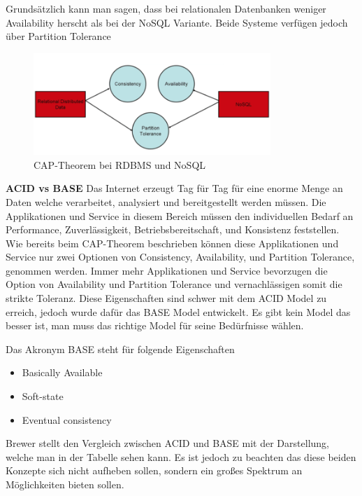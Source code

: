 Grundsätzlich kann man sagen, dass bei relationalen Datenbanken weniger Availability herscht als bei der NoSQL Variante. Beide Systeme verfügen jedoch über Partition Tolerance\cite{MELD.CH2-noSQL.capTheoremComp}

\begin{figure}[!htb]\centering
	\includegraphics[width=0.8\textwidth]{images/capTheorem}
	\caption{CAP-Theorem bei RDBMS und NoSQL\cite{MELD.CH2-noSQL.capTheoremComp}}
\end{figure}

\tab\textbf{ACID vs BASE\newline}
Das Internet erzeugt Tag für Tag für eine enorme Menge an Daten welche verarbeitet, analysiert und bereitgestellt werden müssen. Die Applikationen und Service in diesem Bereich müssen den individuellen Bedarf an Performance, Zuverlässigkeit, Betriebsbereitschaft, und Konsistenz feststellen. Wie bereits beim CAP-Theorem beschrieben können diese Applikationen und Service nur zwei Optionen von Consistency, Availability, und Partition Tolerance, genommen werden. Immer mehr Applikationen und Service bevorzugen die Option von Availability und Partition Tolerance und vernachlässigen somit die strikte Toleranz. Diese Eigenschaften sind schwer mit dem ACID Model zu erreich, jedoch wurde dafür das BASE Model entwickelt. Es gibt kein Model das besser ist, man muss das richtige Model für seine Bedürfnisse wählen.

Das Akronym BASE steht für folgende Eigenschaften
\begin{itemize}
	\item Basically Available
	\item Soft-state
	\item Eventual consistency
\end{itemize}

Brewer stellt den Vergleich zwischen ACID und BASE mit der Darstellung, welche man in der Tabelle sehen kann. Es ist jedoch zu beachten das diese beiden Konzepte sich nicht aufheben sollen, sondern ein großes Spektrum an Möglichkeiten bieten sollen. 

